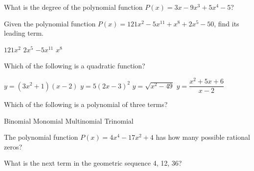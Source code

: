 \begin{questions}

\question What is the degree of the polynomial function $P(x) = 3x - 9x^3 + 5x^4 -5$?  
\begin{multicols}{4}
\begin{choices}  
\end{choices}
\end{multicols}

\question Given the polynomial function $P(x) = 121x^2 - 5x^{11} + x^8 + 2x^5 - 50$, find its  leading term.
\begin{multicols}{4}
\begin{choices}  
\choice $121x^2$
\choice $2x^5$
\CorrectChoice $- 5x^{11} $
\choice $x^8$
\end{choices}
\end{multicols} 

\question Which of the following is a quadratic function?
\begin{multicols}{2}
\begin{choices}  
\choice $y=(3x^2+1)(x-2)$
\CorrectChoice $y=5(2x-3)^2$
\choice $y=\sqrt{x^2-49} $
\choice $y=\dfrac{x^2+5x+6}{x-2} $
\end{choices}
\end{multicols} 

\question Which of the following is a  polynomial of  three terms? 
\begin{multicols}{4}
\begin{choices}  
\choice Binomial 
\choice Monomial 
\choice Multinomial 
\CorrectChoice Trinomial 
\end{choices}
\end{multicols} 

\question The polynomial  function $P(x) = 4x^4  - 17x^2 + 4$ has how many  possible rational zeros?
\begin{multicols}{4}
\begin{choices} 
\end{choices}
\end{multicols} 

\question What is the next term in the geometric sequence  4, 12, 36? 
\begin{multicols}{4}
\begin{choices} 
\end{choices}
\end{multicols} 


\end{questions}
